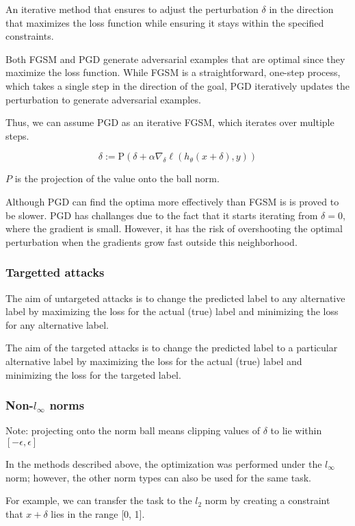 An iterative method that ensures to adjust the perturbation $\delta$ in the direction that maximizes the loss function 
while ensuring it stays within the specified constraints.

Both FGSM and PGD generate adversarial examples that are optimal since they maximize the loss function.
While FGSM is a straightforward, one-step process, which takes a single step in the direction of the goal,
PGD iteratively updates the perturbation to generate adversarial examples. 

Thus, we can assume PGD as an iterative FGSM, which iterates over multiple steps.

\[\delta := \text{P}(\delta + \alpha \nabla_{\delta} \ell(h_\theta(x + \delta), y))\]

$P$ is the projection of the value onto the ball norm.

Although PGD can find the optima more effectively than FGSM is is proved to be slower. PGD has challanges due to the fact that it starts iterating 
from $\delta = 0$, where the gradient is small. However, it has the risk of overshooting the optimal 
perturbation when the gradients grow fast outside this neighborhood. 


\subsubsection{Targetted attacks}

The aim of untargeted attacks is to change the predicted label to any alternative label 
by maximizing the loss for the actual (true) label and minimizing the loss for any alternative label. 

The aim of the targeted attacks is to change the predicted label to a particular alternative label 
by maximizing the loss for the actual (true) label and minimizing the loss for the targeted label. 


\subsubsection{Non-$l_{\infty}$ norms}

Note: projecting onto the norm ball means clipping values of $\delta$ to lie within $[-\epsilon, \epsilon]$

In the methods described above, the optimization was performed under the $l_{\infty}$ norm; however, 
the other norm types can also be used for the same task.

For example, we can transfer the task to the $l_2$ norm by creating a constraint that $x+\delta$ lies in the range [0, 1].

